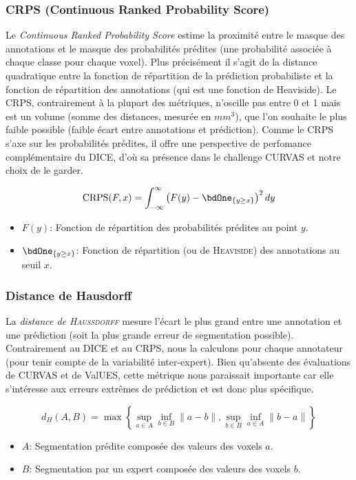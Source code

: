 \documentclass[a4paper,french,bookmarks,12pt]{article}
\begin{document}
    \subsubsection*{CRPS (Continuous Ranked Probability Score)}
    
    Le \emph{Continuous Ranked Probability Score} estime la proximité entre le masque des annotations et le masque des probabilités prédites (une probabilité associée à chaque classe pour chaque voxel). Plus précisément il s'agit de la distance quadratique entre la fonction de répartition de la prédiction probabiliste et la fonction de répartition des annotations (qui est une fonction de Heaviside). Le CRPS, contrairement à la plupart des métriques, n'oscille pas entre 0 et 1 mais est un volume (somme des distances, mesurée en $mm^3$), que l'on souhaite le plus faible possible (faible écart entre annotations et prédiction). Comme le CRPS s'axe sur les probabilités prédites, il offre une perspective de perfomance complémentaire du DICE, d'où sa présence dans le challenge CURVAS et notre choix de le garder.
      
    \[ \text{CRPS}(F, x) = \int_{-\infty}^{\infty} \left( F(y) - \bdOne_{\{y \geq x\}} \right)^2 dy \]
    \begin{itemize}
        \item \( F(y) \): Fonction de répartition des probabilités prédites au point \( y \).
        \item \( \bdOne_{\{y \geq x\}} \): Fonction de répartition (ou de \textsc{Heaviside}) des annotations au seuil \(x\).
    \end{itemize}

    \subsubsection*{Distance de Hausdorff}

    La \emph{distance de \textsc{Haussdorff}} mesure l'écart le plus grand entre une annotation et une prédiction (soit la plus grande erreur de segmentation possible). Contrairement au DICE et au CRPS, nous la calculons pour chaque annotateur (pour tenir compte de la variabilité inter-expert). Bien qu'absente des évaluations de CURVAS et de ValUES, cette métrique nous paraissait importante car elle s'intéresse aux erreurs extrêmes de prédiction et est donc plus spécifique.

    \[ d_H(A, B) = \max\left\{ \sup\limits_{a \in A} \inf\limits_{b \in B} \|a - b\|, \sup_{b \in B} \inf_{a \in A} \|b - a\| \right\}
    \]
    \begin{itemize}
        \item \( A \): Segmentation prédite composée des valeurs des voxels \(a\).
        \item \( B \): Segmentation par un expert composée des valeurs des voxels \(b\).
    \end{itemize}
\end{document}
